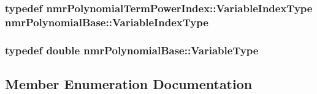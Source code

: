 \subsubsection[{Variable\+Index\+Type}]{\setlength{\rightskip}{0pt plus 5cm}typedef {\bf nmr\+Polynomial\+Term\+Power\+Index\+::\+Variable\+Index\+Type} {\bf nmr\+Polynomial\+Base\+::\+Variable\+Index\+Type}}\label{classnmr_polynomial_base_aae95477e451ddc7d3ee3f41cbdaadde2}
\hypertarget{classnmr_polynomial_base_a666e909572cf22856c965d47f243a633}{}
\subsubsection[{Variable\+Type}]{\setlength{\rightskip}{0pt plus 5cm}typedef double {\bf nmr\+Polynomial\+Base\+::\+Variable\+Type}}\label{classnmr_polynomial_base_a666e909572cf22856c965d47f243a633}


\subsection{Member Enumeration Documentation}
\hypertarget{classnmr_polynomial_base_ac3b6b28653104ea70419279a35580940}{}

